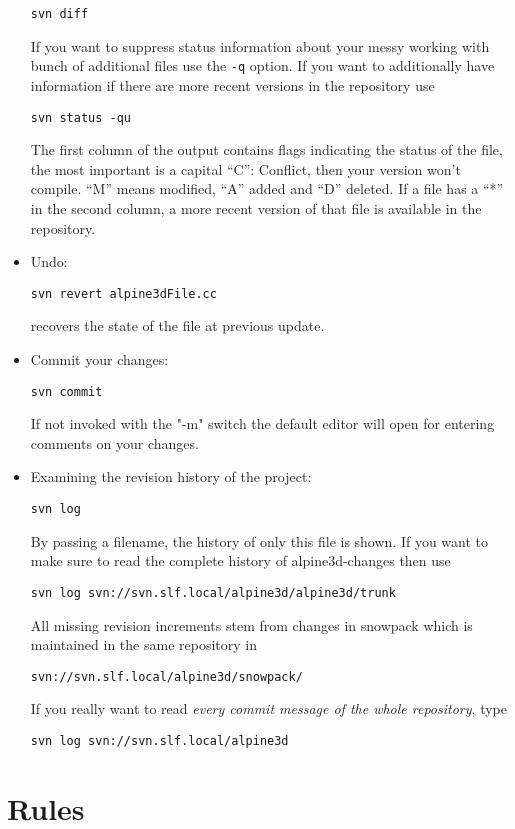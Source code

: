 \documentclass[12pt]{report}
\begin{document}
\begin{itemize}
  \verb+svn diff+

  \noindent If you want to suppress status information about your
  messy working with bunch of additional files use the \verb+-q+
  option. If you want to additionally have information if there are
  more recent versions in the repository use

  \verb+svn status -qu+

  The first column of the output contains flags indicating the status
  of the file, the most important is a capital ``C'': Conflict, then
  your version won't compile. ``M'' means modified, ``A'' added and
  ``D'' deleted. If a file has a ``*'' in the second column, a more
  recent version of that file is available in the repository.

\item Undo:

  \verb+svn revert alpine3dFile.cc+

  recovers the state of the file at previous update.
\item Commit your changes:

  \verb+svn commit+

  \noindent If not invoked with the "-m" switch the default editor
  will open for entering comments on your changes.

\item Examining the revision history of the project:

  \verb+svn log+

  By passing a filename, the history of only this file is shown.
  If you want to make sure to read the complete history of
  alpine3d-changes then use

  \verb+svn log svn://svn.slf.local/alpine3d/alpine3d/trunk+

  All missing revision increments stem from changes in snowpack which
  is maintained in the same repository in

  \verb+svn://svn.slf.local/alpine3d/snowpack/+

  If you really want to read {\em every commit message of the whole
    repository}, type

  \verb+svn log svn://svn.slf.local/alpine3d+

\end{itemize}



\section{Rules}
\end{document}
